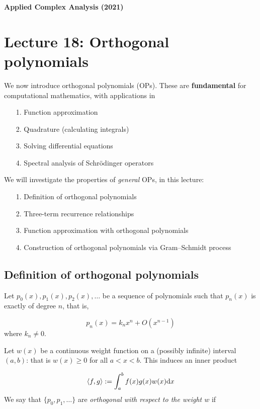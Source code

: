 \documentclass[12pt,landscape]{article}
\def\D{ {\rm d} }
\def\ip<#1>{\left\langle{#1}\right\rangle}
\def\dx{\D x}
\def\endash{–}
\begin{document}
{\LARGE
\sf
\textbf{Applied Complex Analysis (2021)}

\section{Lecture 18: Orthogonal polynomials}
We now introduce orthogonal polynomials (OPs). These are \textbf{fundamental} for computational mathematics, with applications in

\begin{itemize}
\item[1. ] Function approximation


\item[2. ] Quadrature (calculating integrals)


\item[3. ] Solving differential equations


\item[4. ] Spectral analysis of Schrödinger operators

\end{itemize}
We will investigate the properties of \emph{general} OPs, in this lecture:

\begin{itemize}
\item[1. ] Definition of orthogonal polynomials


\item[2. ] Three-term recurrence relationships


\item[3. ] Function approximation with orthogonal polynomials


\item[4. ] Construction of orthogonal polynomials via Gram\ensuremath{\endash}Schmidt process

\end{itemize}
\newpage
\subsection{Definition of orthogonal polynomials}
Let $p_0(x),p_1(x),p_2(x),\ensuremath{\ldots}$ be a sequence of polynomials such that $p_n(x)$ is exactly of degree $n$, that is,

\[
p_n(x) = k_n x^n + O(x^{n-1})
\]
where $k_n \neq 0$.

Let $w(x)$ be a continuous weight function on a (possibly infinite) interval $(a,b)$: that is $w(x) \geq 0$ for all $a < x < b$. This induces an inner product

\[
\ip<f,g> := \int_a^b f(x) g(x) w(x) \dx
\]
We say that $\{p_0, p_1,\ldots\}$ are \emph{orthogonal with respect to the weight $w$} if

}
\end{document}

